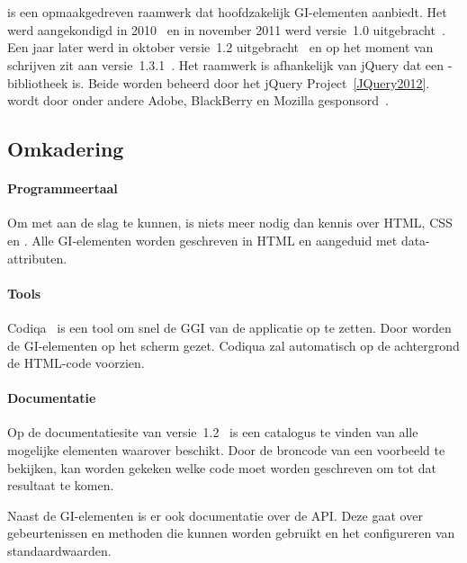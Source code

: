 
\section{\jqm}
\label{sec:raamwerk-jqm}
\jqm{} is een opmaakgedreven raamwerk dat hoofdzakelijk GI-elementen aanbiedt.
Het werd aangekondigd in 2010~\cite{Resig2010} en in november 2011 werd versie~1.0 uitgebracht~\cite{Parker2011}.
Een jaar later werd in oktober versie~1.2 uitgebracht~\cite{Parker2012} en op het moment van schrijven zit \jqm{} aan versie~1.3.1~\cite{Parker2013b}. 
Het raamwerk is afhankelijk van jQuery dat een \js{}-bibliotheek is.
Beide worden beheerd door het jQuery Project~\ref{JQuery2012}. 
\jqm{} wordt door onder andere Adobe, BlackBerry en Mozilla gesponsord~\cite{JQuery2012a}.

\subsection{Omkadering}
\paragraph{Programmeertaal}
Om met \jqm{} aan de slag te kunnen, is niets meer nodig dan kennis over HTML, CSS en \js{}. 
Alle GI-elementen worden geschreven in HTML en aangeduid met data-attributen.

\paragraph{Tools}
Codiqa~\cite{Sperry2012} is een tool om snel de GGI van de applicatie op te zetten.
Door  worden de GI-elementen op het scherm gezet.
Codiqua zal automatisch op de achtergrond de HTML-code voorzien.

\paragraph{Documentatie}
Op de documentatiesite van versie~1.2~\cite{JQuery2012b} is een catalogus te vinden van alle mogelijke elementen waarover \jqm{} beschikt. 
Door de broncode van een voorbeeld te bekijken, kan worden gekeken welke code moet worden geschreven om tot dat resultaat te komen.

Naast de GI-elementen is er ook documentatie over de API.
Deze gaat over gebeurtenissen en methoden die kunnen worden gebruikt en het configureren van standaardwaarden.

